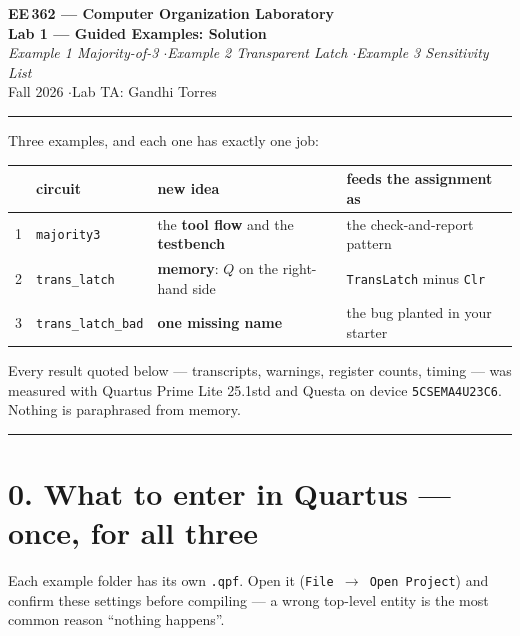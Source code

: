 \documentclass[11pt]{article}
\newcommand{\code}[1]{\texttt{#1}}
\newcommand{\hr}{\vspace{2pt}\hrule\vspace{6pt}}
\begin{document}
\begin{center}
{\Large\bfseries EE\,362 --- Computer Organization Laboratory}\\[2pt]
{\large\bfseries Lab 1 --- Guided Examples: Solution}\\[2pt]
{\itshape Example 1 Majority-of-3 \quad$\cdot$\quad Example 2 Transparent Latch \quad$\cdot$\quad Example 3 Sensitivity List}\\[4pt]
Fall 2026 \quad$\cdot$\quad Lab TA: Gandhi Torres
\end{center}
\hr

Three examples, and each one has exactly one job:

\begin{center}
\begin{tabular}{clll}
\toprule
& circuit & new idea & feeds the assignment as \\
\midrule
1 & \code{majority3} & the \textbf{tool flow} and the \textbf{testbench} & the check-and-report pattern \\
2 & \code{trans\_latch} & \textbf{memory}: $Q$ on the right-hand side & \code{TransLatch} minus \code{Clr} \\
3 & \code{trans\_latch\_bad} & \textbf{one missing name} & the bug planted in your starter \\
\bottomrule
\end{tabular}
\end{center}

Every result quoted below --- transcripts, warnings, register counts, timing --- was
measured with Quartus Prime Lite 25.1std and Questa on device \code{5CSEMA4U23C6}.
Nothing is paraphrased from memory.

\vspace{4pt}\hr

\section*{0. What to enter in Quartus --- once, for all three}

Each example folder has its own \code{.qpf}. Open it (\code{File $\rightarrow$ Open
Project}) and confirm these settings before compiling --- a wrong top-level entity
is the most common reason ``nothing happens''.
\end{document}
